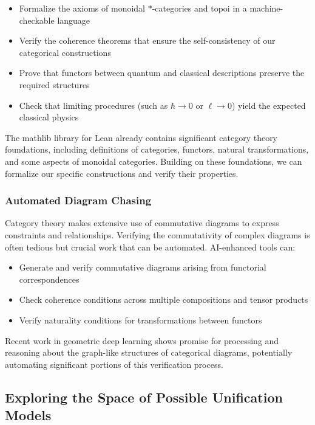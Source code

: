 \begin{itemize}
    \item Formalize the axioms of monoidal $*$-categories and topoi in a machine-checkable language
    \item Verify the coherence theorems that ensure the self-consistency of our categorical constructions
    \item Prove that functors between quantum and classical descriptions preserve the required structures
    \item Check that limiting procedures (such as $\hbar \to 0$ or $\ell \to 0$) yield the expected classical physics
\end{itemize}

The mathlib library for Lean already contains significant category theory foundations, including definitions of categories, functors, natural transformations, and some aspects of monoidal categories. Building on these foundations, we can formalize our specific constructions and verify their properties.

\subsubsection{Automated Diagram Chasing}

Category theory makes extensive use of commutative diagrams to express constraints and relationships. Verifying the commutativity of complex diagrams is often tedious but crucial work that can be automated. AI-enhanced tools can:

\begin{itemize}
    \item Generate and verify commutative diagrams arising from functorial correspondences
    \item Check coherence conditions across multiple compositions and tensor products
    \item Verify naturality conditions for transformations between functors
\end{itemize}

Recent work in geometric deep learning shows promise for processing and reasoning about the graph-like structures of categorical diagrams, potentially automating significant portions of this verification process.

\subsection{Exploring the Space of Possible Unification Models}

